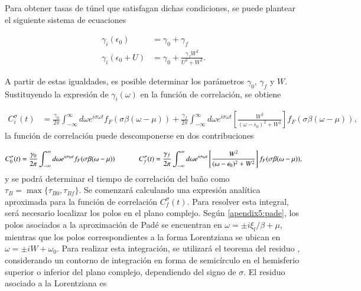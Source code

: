 \begin{appendixs}

Para obtener tasas de túnel que satisfagan dichas condiciones, se puede plantear el siguiente sistema de ecuaciones 

\begin{align*}
    \gamma_{i}(\epsilon_{0}) & = \gamma_{0} + \gamma_{f} \\
    \gamma_{i}(\epsilon_{0} + U) & = \gamma_{0} + \frac{\gamma_{f} W^{2} }{U^{2} + W^{2}}.
\end{align*}

A partir de estas igualdades, es posible determinar los parámetros $\gamma_{0}$, $\gamma_{f}$ y $W$. Sustituyendo la expresión de $\gamma_{i}(\omega)$ en la función de correlación, se obtiene

\begin{align*}
    C^{\sigma}_{i}(t) & = \frac{\gamma_{0}}{2\pi} \int_{-\infty}^{\infty}d\omega e^{i\sigma \omega t} f_{F}(\sigma \beta (\omega-\mu)) + \frac{\gamma_{f}}{2\pi} \int_{-\infty}^{\infty}d\omega e^{i\sigma \omega t}\left[ \frac{W^{2}}{(\omega-\epsilon_{0})^{2} + W^{2}} \right] f_{F}(\sigma \beta (\omega-\mu)),
\end{align*}
la función de correlación puede descomponerse en dos contribuciones

\begin{equation*}
    C^{\sigma}_{0}(t) = \frac{\gamma_{0}}{2\pi} \int_{-\infty}^{\infty}d\omega e^{i\sigma \omega t} f_{F}(\sigma \beta (\omega-\mu)) \hspace{12mm} C^{\sigma}_{f}(t) = \frac{\gamma_{f}}{2\pi} \int_{-\infty}^{\infty}d\omega e^{i\sigma \omega t}\left[ \frac{W^{2}}{(\omega-\epsilon_{0})^{2} + W^{2}} \right] f_{F}(\sigma \beta (\omega-\mu)),
\end{equation*}
y se podrá determinar el tiempo de correlación del baño como $\tau_{B} = \max\{\tau_{B0}, \tau_{Bf}\}$. Se comenzará calculando una expresión analítica aproximada para la función de correlación $C^{\sigma}_{f}(t)$. Para resolver esta integral, será necesario localizar los polos en el plano complejo. Según \ref{apendix5:pade}, los polos asociados a la aproximación de Padé se encuentran en $\omega = \pm i \xi_{l}/\beta + \mu$, mientras que los polos correspondientes a la forma Lorentziana se ubican en $\omega = \pm i W + \omega_{0}$. Para realizar esta integración, se utilizará el teorema del residuo \cite{riley2006mathematical}, considerando un contorno de integración en forma de semicírculo en el hemisferio superior o inferior del plano complejo, dependiendo del signo de $\sigma$. El residuo asociado a la Lorentziana es


\end{appendixs}
